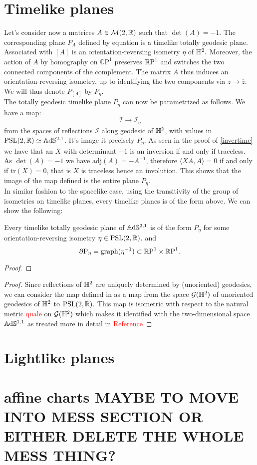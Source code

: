 \section{Timelike planes}
Let's consider now a matrices $A\in\mathcal{M}(2,\R)$ such that $\det(A)=-1.$ The corresponding plane $P_A$ defined by equation  is a timelike totally geodesic plane. Associated with $[A]$ is an orientation-reversing isometry $\eta$ of $\H^2.$ Moreover, the action of $A$ by homography on $\mathbb{C}\text{P}^1$ preserves $\S$ and switches the two connected components of the complement. The matrix $A$ thus induces an orientation-reversing isometry, up to identifying the two components via $z\to\overline{z}$. We will thus denote $P_[A]$ by $P_\eta$. \\
The totally geodesic timelike plane $P_\eta$ can now be parametrized as follows. We have a map: 
\begin{equation}\label{refspa}
    \mathcal{I}\to\mathcal{I}_\eta
\end{equation}
from the spaces of reflections $\mathcal{I}$ along geodesic of $\H^2$, with values in $\PSL\simeq\A^{2,1}$. It's image it precisely $P_\eta.$ As seen in the proof of \ref{invertime} we have that an $X$ with determinant $-1$ is an inversion if and only if traceless. As $\det(A)=-1$ we have $\text{adj}(A)=-A^{-1}$, therefore $\langle XA,A\rangle=0$ if and only if $\text{tr}(X)=0$, that is $X$ is traceless hence an involution. This shows that the image of the map defined  is the entire plane $P_\eta$.\\  
In similar fashion to the spacelike case, using the transitivity of the group of isometries on timelike planes, every timelike planes is of the form above. We can show the following: 
\begin{lemma}
    Every timelike totally geodesic plane of $\A^{2,1}$ is of the form $P_\eta$ for some orientation-reversing isometry $\eta\in\PSL,$ and 
    \[
        \partial\text{P}_\eta=\text{graph}(\eta^{-1})\subset\T.
    \]
\end{lemma}
\begin{proof}
    
\end{proof}
\begin{proof}
    Since reflections of $\H^2$ are uniquely determined by (unoriented) geodesics, we can consider the map defined in  as a map from the space $\mathcal{G}(\H^2)$ of unoriented geodesics of $\H^2$ to $\PSL.$ This map is isometric with respect to the natural metric \textcolor{red}{quale} on $\mathcal{G}(\H^2)$ which makes it identified with the two-dimensional space $\A^{1,1}$ as treated more in detail in \textcolor{red}{Reference}
    \end{proof}
\section{Lightlike planes}
\section{affine charts MAYBE TO MOVE INTO MESS SECTION OR EITHER DELETE THE WHOLE MESS THING?}
